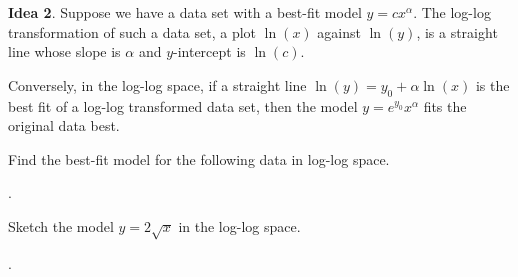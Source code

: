 \documentclass[../main.tex]{subfiles}
\begin{document}
\begin{mdframed}[style=simple]
  \textbf{Idea 2}. Suppose we have a data set with a best-fit model \(y = c x^{\alpha}\). 
  The log-log transformation of such a data set, a plot \(\ln(x)\) against \(\ln(y)\), is a straight line whose slope is \(\alpha\) and \(y\)-intercept is \(\ln(c)\).

  Conversely, in the log-log space, if a straight line \(\ln(y) = y_{0} + \alpha \ln(x)\) is the best fit of a log-log transformed data set, then the model \(y = e^{y_{0}} x^{\alpha}\) fits the original data best.
\end{mdframed}

\begin{example}
  Find the best-fit model for the following data in log-log space.

  .
\end{example}

\begin{example}
  Sketch the model \(y = 2 \sqrt{x}\) in the log-log space.

  .
\end{example}
\end{document}
